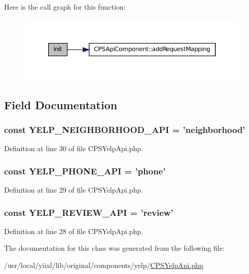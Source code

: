 Here is the call graph for this function:\nopagebreak
\begin{figure}[H]
\begin{center}
\leavevmode
\includegraphics[width=358pt]{classCPSYelpApi_a4be4055f3361d4800e16bc2e2e38cda6_cgraph}
\end{center}
\end{figure}




\subsection{Field Documentation}
\hypertarget{classCPSYelpApi_ada9a084b29490d7ad96bc435526966e5}{
\subsubsection[{YELP\_\-NEIGHBORHOOD\_\-API}]{\setlength{\rightskip}{0pt plus 5cm}const {\bf YELP\_\-NEIGHBORHOOD\_\-API} = 'neighborhood'}}
\label{classCPSYelpApi_ada9a084b29490d7ad96bc435526966e5}


Definition at line 30 of file CPSYelpApi.php.

\hypertarget{classCPSYelpApi_a8123f4b6b144f8a3eb0d4ed3b6fb2128}{
\subsubsection[{YELP\_\-PHONE\_\-API}]{\setlength{\rightskip}{0pt plus 5cm}const {\bf YELP\_\-PHONE\_\-API} = 'phone'}}
\label{classCPSYelpApi_a8123f4b6b144f8a3eb0d4ed3b6fb2128}


Definition at line 29 of file CPSYelpApi.php.

\hypertarget{classCPSYelpApi_a9b561bcfa096fa859d70ff6e96b51b19}{
\subsubsection[{YELP\_\-REVIEW\_\-API}]{\setlength{\rightskip}{0pt plus 5cm}const {\bf YELP\_\-REVIEW\_\-API} = 'review'}}
\label{classCPSYelpApi_a9b561bcfa096fa859d70ff6e96b51b19}


Definition at line 28 of file CPSYelpApi.php.



The documentation for this class was generated from the following file:\begin{DoxyCompactItemize}
\item 
/usr/local/yiixl/lib/original/components/yelp/\hyperlink{CPSYelpApi_8php}{CPSYelpApi.php}\end{DoxyCompactItemize}
